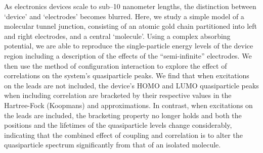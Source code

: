 As electronics devices scale to sub--10 nanometer lengths, the distinction
between `device' and `electrodes' becomes blurred.
Here, we study a simple model of a molecular tunnel junction, consisting
of an atomic gold chain partitioned into left and right electrodes, and a
central `molecule'.
Using a complex absorbing potential, we are able to reproduce the
single-particle energy levels of the device region including a description
of the effects of the ``semi-infinite'' electrodes.
We then use the method of configuration interaction to explore the effect
of correlations on the system's quasiparticle peaks.
We find that when excitations on the leads are not included, the device's
\ac{HOMO} and \ac{LUMO} quasiparticle peaks when including correlation
are bracketed by their respective values in the Hartree-Fock (Koopmans)
and \dscf approximations.
In contrast, when excitations on the leads are included, the bracketing
property no longer holds and both the positions and the lifetimes of the
quasiparticle levels change considerably, indicating that the combined
effect of coupling and correlation is to alter the quasiparticle spectrum
significantly from that of an isolated molecule.
